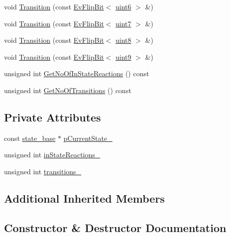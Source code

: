 \begin{DoxyCompactItemize}
void \mbox{\hyperlink{struct_bit_machine_aa139bb8076c9041eae686111879dbdd1}{Transition}} (const \mbox{\hyperlink{struct_ev_flip_bit}{Ev\+Flip\+Bit}}$<$ \mbox{\hyperlink{_performance_8cpp_a76e4a9cf398589b4ad27852c9f4389f9}{uint6}} $>$ \&)
\item 
void \mbox{\hyperlink{struct_bit_machine_a006a8fcc19034fae402a95505f3ccafe}{Transition}} (const \mbox{\hyperlink{struct_ev_flip_bit}{Ev\+Flip\+Bit}}$<$ \mbox{\hyperlink{_performance_8cpp_ae332b751ff9ebef63d125fdaaaf45f8c}{uint7}} $>$ \&)
\item 
void \mbox{\hyperlink{struct_bit_machine_a1ee9e973bde376f8b952b6ad14b6b246}{Transition}} (const \mbox{\hyperlink{struct_ev_flip_bit}{Ev\+Flip\+Bit}}$<$ \mbox{\hyperlink{_performance_8cpp_acf7191ac01fae99fae3f5a89e4f8a8ff}{uint8}} $>$ \&)
\item 
void \mbox{\hyperlink{struct_bit_machine_a3ef5a60f15cd15bb46b63d2a86594c5a}{Transition}} (const \mbox{\hyperlink{struct_ev_flip_bit}{Ev\+Flip\+Bit}}$<$ \mbox{\hyperlink{_performance_8cpp_ac1d5f5aee5a76e77d960741a1bd84b12}{uint9}} $>$ \&)
\item 
unsigned int \mbox{\hyperlink{struct_bit_machine_a7e488a02bcdc1984dd078aff1db33ce1}{Get\+No\+Of\+In\+State\+Reactions}} () const
\item 
unsigned int \mbox{\hyperlink{struct_bit_machine_a1e02c163421c8981a86405ed8c83c9c0}{Get\+No\+Of\+Transitions}} () const
\end{DoxyCompactItemize}
\subsection*{Private Attributes}
\begin{DoxyCompactItemize}
\item 
const \mbox{\hyperlink{classstate__base}{state\+\_\+base}} $\ast$ \mbox{\hyperlink{struct_bit_machine_a22ecd751130c63597ce80ca5c1d9bff3}{p\+Current\+State\+\_\+}}
\item 
unsigned int \mbox{\hyperlink{struct_bit_machine_ad35b2868f25bc77b9b9db1f1e9d03c8b}{in\+State\+Reactions\+\_\+}}
\item 
unsigned int \mbox{\hyperlink{struct_bit_machine_a042875c3dcc1ff444ddd45df5ca47c56}{transitions\+\_\+}}
\end{DoxyCompactItemize}
\subsection*{Additional Inherited Members}


\subsection{Constructor \& Destructor Documentation}
\mbox{\label{struct_bit_machine_a58f14b49b03c4763e3c4b8737ba285fe}} 
